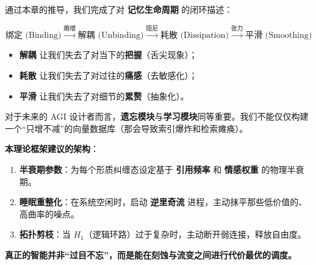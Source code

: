 通过本章的推导，我们完成了对 \textbf{记忆生命周期} 的闭环描述：

$$ \text{绑定 (Binding)} \xrightarrow{\text{熵增}} \text{解耦 (Unbinding)} \xrightarrow{\text{阻尼}} \text{耗散 (Dissipation)} \xrightarrow{\text{张力}} \text{平滑 (Smoothing)} $$

\begin{itemize}
    \item   \textbf{解耦} 让我们失去了对当下的\textbf{把握}（舌尖现象）；
    \item   \textbf{耗散} 让我们失去了对过往的\textbf{痛感}（去敏感化）；
    \item   \textbf{平滑} 让我们失去了对细节的\textbf{累赘}（抽象化）。
\end{itemize}


对于未来的 AGI 设计者而言，\textbf{遗忘模块}与\textbf{学习模块}同等重要。我们不能仅仅构建一个“只增不减”的向量数据库（那会导致索引爆炸和检索瘫痪）。

\textbf{本理论框架建议的架构}：
\begin{enumerate}
    \item \textbf{半衰期参数}：为每个形质纠缠态设定基于 \textbf{引用频率} 和 \textbf{情感权重} 的物理半衰期。
    \item \textbf{睡眠重整化}：在系统空闲时，启动 \textbf{逆里奇流} 进程，主动抹平那些低价值的、高曲率的噪点。
    \item \textbf{拓扑剪枝}：当 $H_1$（逻辑环路）过于复杂时，主动断开弱连接，释放自由度。
\end{enumerate}

\textbf{真正的智能并非“过目不忘”，而是能在刻蚀与流变之间进行代价最优的调度。}

